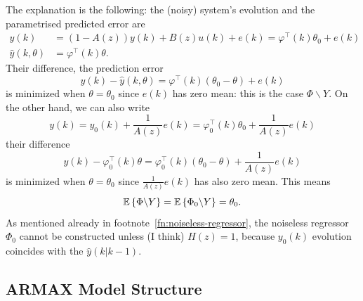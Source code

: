 The explanation is the following: the (noisy) system's evolution and the parametrised predicted error are
\begin{align*}
  y(k) &= (1-A(z))y(k) + B(z)u(k) + e(k) = \varphi^\top(k)\theta_0 + e(k) \\
  \hat{y}(k,\theta) &= \varphi^\top(k)\theta.
\end{align*}
Their difference, the prediction error
\begin{equation*}
  y(k)-\hat{y}(k,\theta) = \varphi^\top(k)(\theta_0-\theta) + e(k)
\end{equation*}
is minimized when $\theta=\theta_0$ since $e(k)$ has zero mean: this is the case $\Phi\backslash Y$. On the other hand, we can also write
\begin{equation*}
  y(k) = y_0(k) + \frac{1}{A(z)}e(k) = \varphi_0^\top(k)\theta_0 + \frac{1}{A(z)}e(k)
\end{equation*}
their difference
\begin{equation*}
  y(k) - \varphi_0^\top(k)\theta = \varphi_0^\top(k)(\theta_0-\theta) + \frac{1}{A(z)}e(k)
\end{equation*}
is minimized when $\theta=\theta_0$ since $\frac{1}{A(z)}e(k)$ has also zero mean. This means
\begin{equation*}
  \mathbb{E}\left\{\Phi\backslash Y\right\} = \mathbb{E}\left\{\Phi_0\backslash Y\right\} = \theta_0.
\end{equation*}
As mentioned already in footnote~\ref{fn:noiseless-regressor}, the noiseless regressor $\Phi_0$ cannot be constructed unless (I think) $H(z)=1$, because $y_0(k)$ evolution coincides with the $\hat{y}(k|k-1)$.

\subsection{ARMAX Model Structure}
\label{sec:ARMAX}

